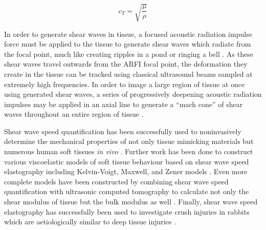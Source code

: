 			\begin{equation}
			\label{equ:litreview_shear_speed}
				c_T = \sqrt{\frac{\mu}{\rho}}
			\end{equation}

			In order to generate shear waves in tissue, a focused acoustic radiation impulse force must be applied to the tissue to generate shear waves which radiate from the focal point, much like creating ripples in a pond or ringing a bell \cite{nightingale03}. As these shear waves travel outwards from the ARFI focal point, the deformation they create in the tissue can be tracked using classical ultrasound beams sampled at extremely high frequencies. In order to image a large region of tissue at once using generated shear waves, a series of progressively deepening acoustic radiation impulses may be applied in an axial line to generate a ``mach cone'' of shear waves throughout an entire region of tissue \cite{bercoff04}.

			Shear wave speed quantification has been successfully used to noninvasively determine the mechanical properties of not only tissue mimicking materials \cite{cao13} but numerous human soft tissues \emph{in vivo} \cite{arda11}. Further work has been done to construct various viscoelastic models of soft tissue behaviour based on shear wave speed elastography including Kelvin-Voigt, Maxwell, and Zener models \cite{chen12,amador12}. Even more complete models have been constructed by combining shear wave speed quantification with ultrasonic computed tomography to calculate not only the shear modulus of tissue but the bulk modulus as well \cite{glozman10}. Finally, shear wave speed elastography has successfully been used to investigate crush injuries in rabbits which are aetiologically similar to deep tissue injuries \cite{lv21}.


